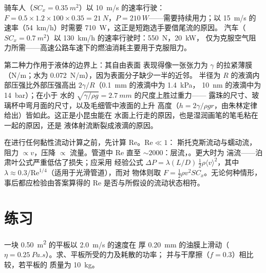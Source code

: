 \begin{example}[骑车人与汽车]\label{ex:b2:viscous-flows:cyclist}
骑车人（$SC_x = \qty{0.35}{m^2}$）以 \qty{10}{m/s} 的速率行驶：$F = 0.5 \times 1.2 \times 100
\times 0.35 = \qty{21}{N}$，$P = \qty{210}{W}$——需要持续用力；以 \qty{15}{m/s}
的速率（\qty{54}{km/h}）时需要 \qty{710}{W}，这正是短跑选手要借尾流的原因。
汽车（$SC_x = \qty{0.7}{m^2}$）以 \qty{130}{km/h} 的速率行驶时：\qty{550}{N}，\qty{20}{kW}，
仅为克服空气阻力所需——高速公路车速下的燃油消耗主要用于克服阻力。
\end{example}

\begin{remark}[表面张力]\label{rem:b2:viscous-flows:capillarity}
第二种力作用于液体的边界上：其自由表面
表现得像一张张力为 $\gamma$ 的拉紧薄膜（\unit{N/m}；水为 
\qty{0.072}{N/m}），因为表面分子缺少一半的近邻。
半径为 $R$ 的液滴内部压强比外部压强高出
\emph{} $2\gamma/R$（\qty{0.1}{mm} 的液滴中为 \qty{1.4}{kPa}，
\qty{10}{nm} 的液滴中为 \qty{14}{bar}）；在小于
水的\emph{} $\sqrt{\gamma/\rho g} = \qty{2.7}{mm}$ 的尺度上胜过重力——
露珠的尺寸、玻璃杯中弯月面的尺寸，以及毛细管中液面的上升
高度（$h = 2\gamma/\rho gr$，由朱林定律给出）皆如此。这正是小昆虫能在
水面上行走的原因，也是湿润画笔的笔毛粘在一起的原因，还是
液体射流断裂成液滴的原因。
\end{remark}

\begin{method}[判断流动状态]\label{met:b2:viscous-flows:regime}
在进行任何黏性流动计算之前，先计算 $\mathrm{Re}$。$\mathrm{Re} \ll 1$：
斯托克斯流动与蠕动流，阻力 $\propto v$，压降 $\propto$
流量。管道中 $\mathrm{Re}$ 直至 $\sim\!2000$：层流，。更大时为
湍流——泊肃叶公式严重低估了损失；应采用
经验公式 $\Delta P = \lambda(L/D)\,\tfrac12\rho\langle v\rangle^2$，其中 $\lambda
\approx 0.3/\mathrm{Re}^{1/4}$（适用于光滑管道），而对
物体则取 $F = \tfrac12\rho v^2SC_x$。无论何种情形，事后都应检验由答案算得的 $\mathrm{Re}$
是否与所假设的流动状态相符。
\end{method}

\section{练习}

\begin{exercise}[$\star$]\label{exo:b2:viscous-flows:1}
一块 \qty{0.50}{m^2} 的平板以 \qty{2.0}{m/s} 的速度在
厚 \qty{0.20}{mm} 的油膜上滑动（$\eta = \qty{0.25}{Pa.s}$）。求、平板所受的力及耗散的功率；
并与干摩擦（$f = 0.3$）相比较，若平板的
质量为 \qty{10}{kg}。
\end{exercise}

